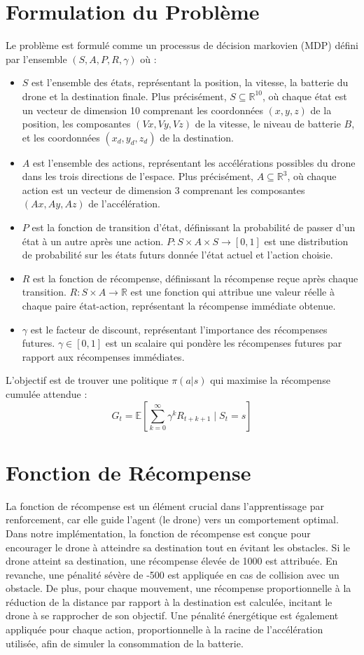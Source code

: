 \documentclass[a4paper, 12pt]{article}
\begin{document}
\section{Formulation du Problème}
Le problème est formulé comme un processus de décision markovien (MDP) défini par l'ensemble $(S, A, P, R, \gamma)$ où :
\begin{itemize}
    \item $S$ est l'ensemble des états, représentant la position, la vitesse, la batterie du drone et la destination finale. Plus précisément, $S \subseteq \mathbb{R}^{10}$, où chaque état est un vecteur de dimension 10 comprenant les coordonnées $(x, y, z)$ de la position, les composantes $(Vx, Vy, Vz)$ de la vitesse, le niveau de batterie $B$, et les coordonnées $(x_d, y_d, z_d)$ de la destination.
    \item $A$ est l'ensemble des actions, représentant les accélérations possibles du drone dans les trois directions de l'espace. Plus précisément, $A \subseteq \mathbb{R}^3$, où chaque action est un vecteur de dimension 3 comprenant les composantes $(Ax, Ay, Az)$ de l'accélération.
    \item $P$ est la fonction de transition d'état, définissant la probabilité de passer d'un état à un autre après une action. $P : S \times A \times S \rightarrow [0, 1]$ est une distribution de probabilité sur les états futurs donnée l'état actuel et l'action choisie.
    \item $R$ est la fonction de récompense, définissant la récompense reçue après chaque transition. $R : S \times A \rightarrow \mathbb{R}$ est une fonction qui attribue une valeur réelle à chaque paire état-action, représentant la récompense immédiate obtenue.
    \item $\gamma$ est le facteur de discount, représentant l'importance des récompenses futures. $\gamma \in [0, 1]$ est un scalaire qui pondère les récompenses futures par rapport aux récompenses immédiates.
\end{itemize}

L'objectif est de trouver une politique $\pi(a|s)$ qui maximise la récompense cumulée attendue :
\[
G_t = \mathbb{E} \left[ \sum_{k=0}^{\infty} \gamma^k R_{t+k+1} \mid S_t = s \right]
\]

\section{Fonction de Récompense}
La fonction de récompense est un élément crucial dans l'apprentissage par renforcement, car elle guide l'agent (le drone) vers un comportement optimal. Dans notre implémentation, la fonction de récompense est conçue pour encourager le drone à atteindre sa destination tout en évitant les obstacles. Si le drone atteint sa destination, une récompense élevée de 1000 est attribuée. En revanche, une pénalité sévère de -500 est appliquée en cas de collision avec un obstacle. De plus, pour chaque mouvement, une récompense proportionnelle à la réduction de la distance par rapport à la destination est calculée, incitant le drone à se rapprocher de son objectif. Une pénalité énergétique est également appliquée pour chaque action, proportionnelle à la racine de l'accélération utilisée, afin de simuler la consommation de la batterie.
\end{document}
